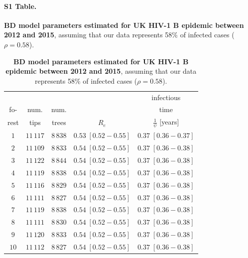 \documentclass[10pt,letterpaper]{article}
\begin{document}
\paragraph*{S1 Table.}
\label{S1_Table}
{\bf BD model parameters estimated for UK HIV-1 B epidemic between 2012 and 2015}, assuming that our data represents 58\% of infected cases ($\rho=0.58$).


\begin{table}[!ht]
\centering
\caption{
{\bf BD model parameters estimated for UK HIV-1 B epidemic between 2012 and 2015}, assuming that our data represents 58\% of infected cases ($\rho=0.58$).}

\begin{tabular}{c|cc|cc}
&&&&infectious\\
fo-&num.&num.&&time\\
rest&tips&trees&$R_e$&$\frac{1}{\psi}$ [years]\\
\toprule
 $1$ & $11\,117$ & $8\,838$ & $0.53\;[0.52-0.55]$& $0.37\;[0.36-0.37]$ \\
 $2$ & $11\,109$ & $8\,833$ & $0.54\;[0.52-0.55]$& $0.37\;[0.36-0.38]$\\
 $3$ & $11\,122$ & $8\,844$ & $0.54\;[0.52-0.55]$& $0.37\;[0.36-0.38]$\\
 $4$ & $11\,119$ & $8\,838$ & $0.54\;[0.52-0.55]$& $0.37\;[0.36-0.38]$\\
 $5$ & $11\,116$ & $8\,829$ & $0.54\;[0.52-0.55]$& $0.37\;[0.36-0.38]$\\
 $6$ & $11\,111$ & $8\,827$ & $0.54\;[0.52-0.55]$& $0.37\;[0.36-0.38]$\\
 $7$ & $11\,119$ & $8\,838$ & $0.54\;[0.52-0.55]$& $0.37\;[0.36-0.38]$\\
 $8$ & $11\,111$ & $8\,830$ & $0.54\;[0.52-0.55]$& $0.37\;[0.36-0.38]$\\
 $9$ & $11\,120$ & $8\,833$ & $0.54\;[0.52-0.55]$& $0.37\;[0.36-0.38]$\\
 $10$ & $11\,112$ & $8\,827$ & $0.54\;[0.52-0.55]$& $0.37\;[0.36-0.38]$\\
 \bottomrule
 \end{tabular}
\label{tbl:uk}
\end{table}
\end{document}
